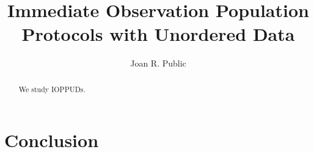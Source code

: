 \documentclass[a4paper,UKenglish,cleveref, autoref, thm-restate]{lipics-v2021}
\title{Immediate Observation Population Protocols with Unordered Data}
\author{Joan R. Public}{Department of Informatics, Dummy College, Country}{joanrpublic@dummycollege.org}{}{}
\begin{document}
	
	\maketitle
	
	
	\begin{abstract}
		We study IOPPUDs.
	\end{abstract}
	
	
	
	

	
	
	
	
	
	
	
	
	\section{Conclusion}
	\label{sec:conclusion}
	
	
\end{document}
